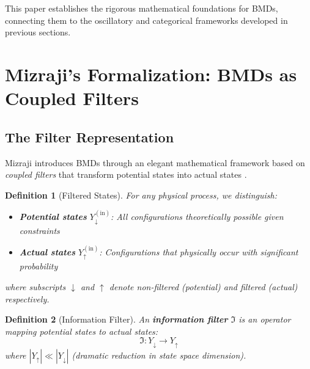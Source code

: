 \documentclass[12pt,a4paper]{article}
\newtheorem{definition}{Definition}
\begin{document}
This paper establishes the rigorous mathematical foundations for BMDs, connecting them to the oscillatory and categorical frameworks developed in previous sections.

\section{Mizraji's Formalization: BMDs as Coupled Filters}

\subsection{The Filter Representation}

Mizraji introduces BMDs through an elegant mathematical framework based on \textit{coupled filters} that transform potential states into actual states \cite{mizraji2021biological}.

\begin{definition}[Filtered States]
\label{def:filtered_states}
For any physical process, we distinguish:
\begin{itemize}
\item \textbf{Potential states} $Y_{\downarrow}^{(\text{in})}$: All configurations theoretically possible given constraints
\item \textbf{Actual states} $Y_{\uparrow}^{(\text{in})}$: Configurations that physically occur with significant probability
\end{itemize}
where subscripts $\downarrow$ and $\uparrow$ denote non-filtered (potential) and filtered (actual) respectively.
\end{definition}

\begin{definition}[Information Filter]
\label{def:info_filter}
An \textbf{information filter} $\Im$ is an operator mapping potential states to actual states:
\begin{equation}
\Im: Y_{\downarrow} \to Y_{\uparrow}
\end{equation}
where $|Y_{\uparrow}| \ll |Y_{\downarrow}|$ (dramatic reduction in state space dimension).
\end{definition}
\end{document}
